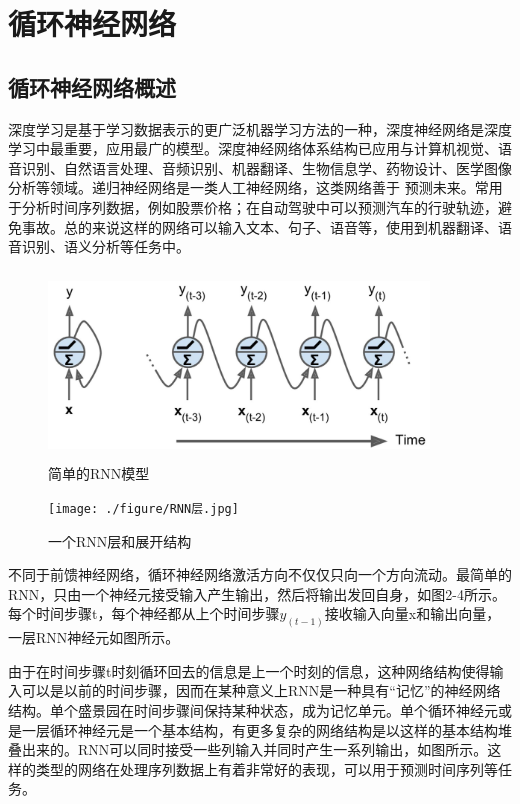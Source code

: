 \documentclass[winfonts,master,oneside,nobackinfo]{njuthesis}
\begin{document}
\section{循环神经网络}

\subsection{循环神经网络概述}

深度学习是基于学习数据表示的更广泛机器学习方法的一种，深度神经网络是深度学习中最重要，应用最广的模型。深度神经网络体系结构已应用与计算机视觉、语音识别、自然语言处理、音频识别、机器翻译、生物信息学、药物设计、医学图像分析等领域。递归神经网络是一类人工神经网络，这类网络善于 预测未来。常用于分析时间序列数据，例如股票价格；在自动驾驶中可以预测汽车的行驶轨迹，避免事故。总的来说这样的网络可以输入文本、句子、语音等，使用到机器翻译、语音识别、语义分析等任务中。

\begin{figure}[h]
\centering
\begin{minipage}[t]{\textwidth}
\includegraphics[width=0.9\textwidth,height=5.0cm]{./figure/simple_rnn.jpg}
\caption{简单的RNN模型}
\label{lab:1}
\end{minipage}
\end{figure}

\begin{figure}[h]
\centering
\begin{minipage}[t]{\textwidth}
\texttt{[image: ./figure/RNN层.jpg]}
\caption{一个RNN层和展开结构}
\label{lab:1}
\end{minipage}
\end{figure}

不同于前馈神经网络，循环神经网络激活方向不仅仅只向一个方向流动。最简单的RNN，只由一个神经元接受输入产生输出，然后将输出发回自身，如图2-4所示。每个时间步骤t，每个神经都从上个时间步骤$y _ { ( t - 1 ) }$接收输入向量x和输出向量，一层RNN神经元如图所示。

由于在时间步骤t时刻循环回去的信息是上一个时刻的信息，这种网络结构使得输入可以是以前的时间步骤，因而在某种意义上RNN是一种具有“记忆”的神经网络结构。单个盛景园在时间步骤间保持某种状态，成为记忆单元。单个循环神经元或是一层循环神经元是一个基本结构，有更多复杂的网络结构是以这样的基本结构堆叠出来的。RNN可以同时接受一些列输入并同时产生一系列输出，如图所示。这样的类型的网络在处理序列数据上有着非常好的表现，可以用于预测时间序列等任务。
\end{document}
